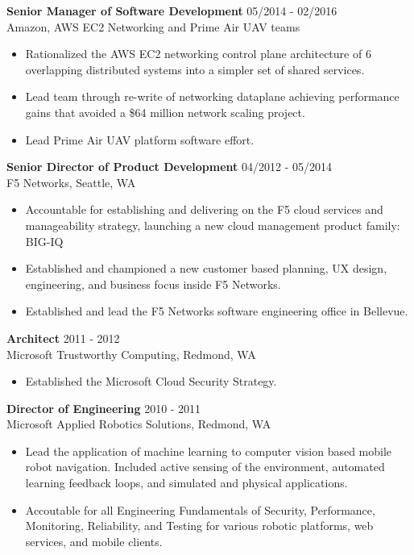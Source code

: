 \begin{resume}
 {\bf Senior Manager of Software Development} \hfill 05/2014 - 02/2016\\
 Amazon, AWS EC2 Networking and Prime Air UAV teams\\
 \begin{itemize} \itemsep -2pt  %
 \item Rationalized the AWS EC2 networking control plane architecture of 6 overlapping distributed systems into a simpler set of shared services.
 \item Lead team through re-write of networking dataplane achieving performance gains that avoided a \$64 million network scaling project.
 \item Lead Prime Air UAV platform software effort.
 \end{itemize}

 {\bf Senior Director of Product Development} \hfill 04/2012 - 05/2014\\
 F5 Networks, Seattle, WA
 \begin{itemize} \itemsep -2pt
 \item Accountable for establishing and delivering on the F5 cloud services and manageability strategy, launching a new cloud management product family: BIG-IQ
 \item Established and championed a new customer based planning, UX design, engineering, and business focus inside F5 Networks.
 \item Established and lead the F5 Networks software engineering office in Bellevue.
 \end{itemize}
 
 {\bf Architect} \hfill 2011 - 2012\\
 Microsoft Trustworthy Computing, Redmond, WA
 \begin{itemize} \itemsep -2pt
 \item Established the Microsoft Cloud Security Strategy.
 \end{itemize}
 
{\bf Director of Engineering} \hfill 2010 - 2011\\
 Microsoft Applied Robotics Solutions, Redmond, WA
 \begin{itemize} \itemsep -2pt
 \item Lead the application of machine learning to computer vision based mobile robot navigation. Included active sensing of the environment, automated learning feedback loops, and simulated and physical applications.
 \item Accoutable for all Engineering Fundamentals of Security, Performance, Monitoring, Reliability, and Testing for various robotic platforms, web services, and mobile clients.
 \end{itemize}
 

\end{resume}
